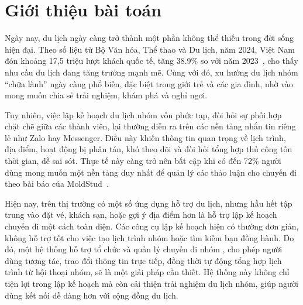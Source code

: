 \section{Giới thiệu bài toán}

Ngày nay, du lịch ngày càng trở thành một phần không thể thiếu trong đời sống hiện đại.
Theo số liệu từ Bộ Văn hóa, Thể thao và Du lịch, năm 2024, Việt Nam đón khoảng 17,5 triệu lượt khách quốc tế, tăng 38.9\% so với năm 2023~\cite{bvhttdl2024}, cho thấy nhu cầu du lịch đang tăng
trưởng mạnh mẽ. Cùng với đó, xu hướng du lịch nhóm ``chữa lành'' ngày càng phổ biến, đặc biệt trong giới trẻ và các gia đình, nhờ vào mong muốn chia sẻ trải nghiệm, khám phá và nghỉ ngơi.

\indent Tuy nhiên, việc lập kế hoạch du lịch nhóm vốn phức tạp, đòi hỏi sự phối hợp chặt chẽ giữa các thành viên, lại thường diễn ra trên các nền tảng nhắn tin riêng lẻ như Zalo hay Messenger. Điều này khiến thông tin quan trọng về lịch trình, địa điểm, hoạt động bị phân tán, khó theo dõi và đòi hỏi tổng hợp thủ công tốn thời gian, dễ sai sót. Thực tế này càng trở nên bất cập khi có đến 72\% người dùng mong muốn một nền tảng duy nhất để quản lý các thảo luận cho chuyến đi theo bài báo của MoldStud~\cite{moldstud_article}. 

\indent Hiện nay, trên thị trường có một số ứng dụng hỗ trợ du lịch, nhưng hầu hết tập trung vào đặt vé, khách sạn, hoặc gợi ý địa điểm hơn là hỗ trợ lập kế hoạch chuyến đi một cách toàn diện. Các công cụ lập kế hoạch hiện có thường đơn giản, không hỗ trợ tốt cho việc tạo lịch trình nhóm hoặc tìm kiếm bạn đồng hành. Do đó, một hệ thống hỗ trợ tổ chức và quản lý chuyến đi nhóm
, cho phép người dùng tương tác, trao đổi thông tin trực tiếp, 
đồng thời tự động tổng hợp lịch trình từ hội thoại nhóm,
 sẽ là một giải pháp cần thiết. Hệ thống này không chỉ tiện lợi trong lập kế hoạch mà còn 
 cải thiện trải nghiệm du lịch nhóm, 
 giúp người dùng kết nối dễ dàng hơn với cộng đồng du lịch.\nl
